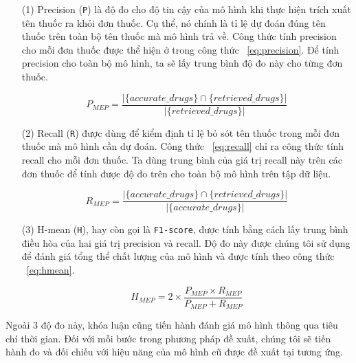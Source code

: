 \begin{itemize}

\item[(1)] Precision (\verb|P|) là độ đo cho độ tin cậy của mô hình khi thực hiện trích xuất tên thuốc ra khỏi đơn thuốc. Cụ thể, nó chính là tỉ lệ dự đoán đúng tên thuốc trên toàn bộ tên thuốc mà mô hình trả về. Công thức tính precision cho mỗi đơn thuốc được thể hiện ở trong công thức ~\ref{eq:precision}. Để tính precision cho toàn bộ mô hình, ta sẽ lấy trung bình độ đo này cho từng đơn thuốc.

\begin{dmath}
    \label{eq:precision}
    P_{MEP} = \frac{|\{accurate\_drugs\} \cap \{ retrieved\_drugs \}|}{|\{ retrieved\_drugs \}|}
\end{dmath}

\item[(2)] Recall (\verb|R|) được dùng để kiểm định tỉ lệ bỏ sót tên thuốc trong mỗi đơn thuốc mà mô hình cần dự đoán. Công thức ~\ref{eq:recall} chỉ ra công thức tính recall cho mỗi đơn thuốc. Ta dùng trung bình của giá trị recall này trên các đơn thuốc để tính được độ đo trên cho toàn bộ mô hình trên tập dữ liệu.

\begin{dmath}
    \label{eq:recall}
    R_{MEP} = \frac{|\{accurate\_drugs\} \cap \{ retrieved\_drugs \}|}{|\{ accurate\_drugs \}|}
\end{dmath}

\item[(3)] H-mean (\verb|H|), hay còn gọi là \verb|F1-score|, được tính bằng cách lấy trung bình điều hòa của hai giá trị precision và recall. Độ đo này được chúng tôi sử dụng để đánh giá tổng thể chất lượng của mô hình và được tính theo công thức ~\ref{eq:hmean}.

\begin{dmath}
    \label{eq:hmean}
    H_{MEP} = 2 \times \frac{P_{MEP} \times R_{MEP}}{P_{MEP} + R_{MEP}}
\end{dmath}

\end{itemize}

Ngoài 3 độ đo này, khóa luận cũng tiến hành đánh giá mô hình thông qua tiêu chí thời gian. Đối với mỗi bước trong phương pháp đề xuất, chúng tôi sẽ tiến hành đo và đối chiếu với hiệu năng của mô hình cũ được đề xuất tại \cite{nguyen2021developing} tương ứng.
